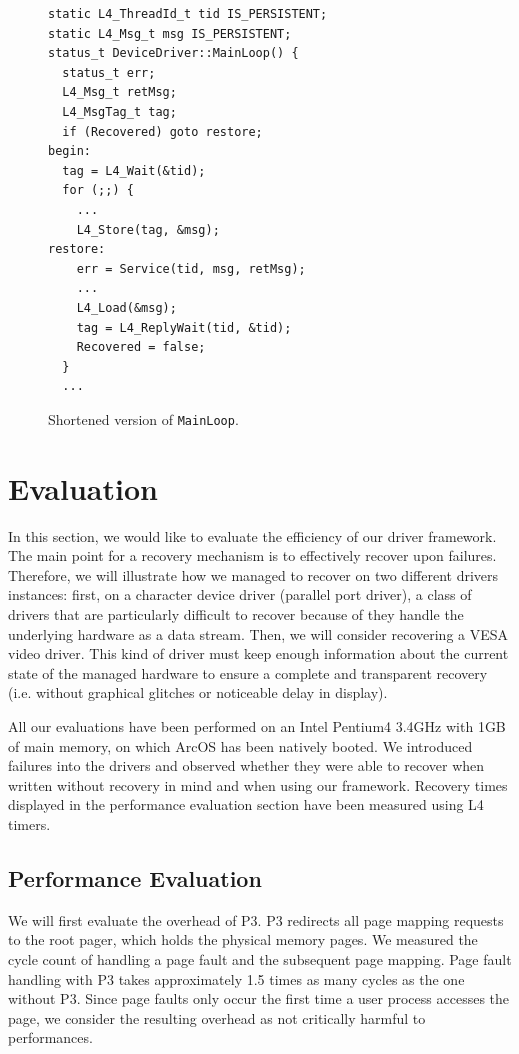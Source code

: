 \documentclass[times, 10pt, twocolumn]{article}
\begin{document}
\begin{figure}[ht]
\centering
\begin{screen}
\scriptsize{
\begin{verbatim}
static L4_ThreadId_t tid IS_PERSISTENT;
static L4_Msg_t msg IS_PERSISTENT;
status_t DeviceDriver::MainLoop() {
  status_t err;
  L4_Msg_t retMsg;
  L4_MsgTag_t tag;
  if (Recovered) goto restore;
begin:
  tag = L4_Wait(&tid);
  for (;;) {
    ...
    L4_Store(tag, &msg);
restore:
    err = Service(tid, msg, retMsg);
    ...
    L4_Load(&msg);
    tag = L4_ReplyWait(tid, &tid);
    Recovered = false;
  }
  ...
\end{verbatim}
}
\end{screen}
\caption{Shortened version of \texttt{MainLoop}.}
\label{fig:mainloop}
\end{figure}

\section{Evaluation}
\label{s:eval}

In this section, we would like to evaluate the efficiency of our driver framework. The main point for a recovery mechanism is to effectively recover upon failures. Therefore, we will illustrate how we managed to recover on two different drivers instances: first, on a character device driver (parallel port driver), a class of drivers that are particularly difficult to recover because of they handle the underlying hardware as a data stream. Then, we will consider recovering a VESA video driver. This kind of driver must keep enough information about the current state of the managed hardware to ensure a complete and transparent recovery (i.e. without graphical glitches or noticeable delay in display).

All our evaluations have been performed on an Intel Pentium4 3.4GHz with 1GB of main memory, on which ArcOS has been natively booted. We introduced failures into the drivers and observed whether they were able to recover when written without recovery in mind and when using our framework. Recovery times displayed in the performance evaluation section have been measured using L4 timers.

\subsection{Performance Evaluation}
We will first evaluate the overhead of P3.  P3 redirects all page mapping requests to the root pager, which holds the physical memory pages.  We measured the cycle count of handling a page fault and the subsequent page mapping.  Page fault handling with P3 takes approximately 1.5 times as many cycles as the one without P3.  Since page faults only occur the first time a user process accesses the page, we consider the resulting overhead as not critically harmful to performances.
\end{document}
